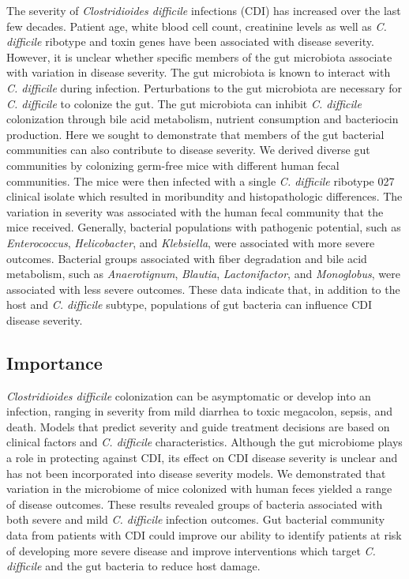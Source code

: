 \documentclass[
  12pt,
]{article}
\begin{document}
The severity of \emph{Clostridioides difficile} infections (CDI) has
increased over the last few decades. Patient age, white blood cell
count, creatinine levels as well as \emph{C. difficile} ribotype and
toxin genes have been associated with disease severity. However, it is
unclear whether specific members of the gut microbiota associate with
variation in disease severity. The gut microbiota is known to interact
with \emph{C. difficile} during infection. Perturbations to the gut
microbiota are necessary for \emph{C. difficile} to colonize the gut.
The gut microbiota can inhibit \emph{C. difficile} colonization through
bile acid metabolism, nutrient consumption and bacteriocin production.
Here we sought to demonstrate that members of the gut bacterial
communities can also contribute to disease severity. We derived diverse
gut communities by colonizing germ-free mice with different human fecal
communities. The mice were then infected with a single \emph{C.
difficile} ribotype 027 clinical isolate which resulted in moribundity
and histopathologic differences. The variation in severity was
associated with the human fecal community that the mice received.
Generally, bacterial populations with pathogenic potential, such as
\emph{Enterococcus}, \emph{Helicobacter}, and \emph{Klebsiella}, were
associated with more severe outcomes. Bacterial groups associated with
fiber degradation and bile acid metabolism, such as \emph{Anaerotignum},
\emph{Blautia}, \emph{Lactonifactor}, and \emph{Monoglobus}, were
associated with less severe outcomes. These data indicate that, in
addition to the host and \emph{C. difficile} subtype, populations of gut
bacteria can influence CDI disease severity.

\hypertarget{importance}{%
\subsection{Importance}\label{importance}}

\emph{Clostridioides difficile} colonization can be asymptomatic or
develop into an infection, ranging in severity from mild diarrhea to
toxic megacolon, sepsis, and death. Models that predict severity and
guide treatment decisions are based on clinical factors and \emph{C.
difficile} characteristics. Although the gut microbiome plays a role in
protecting against CDI, its effect on CDI disease severity is unclear
and has not been incorporated into disease severity models. We
demonstrated that variation in the microbiome of mice colonized with
human feces yielded a range of disease outcomes. These results revealed
groups of bacteria associated with both severe and mild \emph{C.
difficile} infection outcomes. Gut bacterial community data from
patients with CDI could improve our ability to identify patients at risk
of developing more severe disease and improve interventions which target
\emph{C. difficile} and the gut bacteria to reduce host damage.
\end{document}
